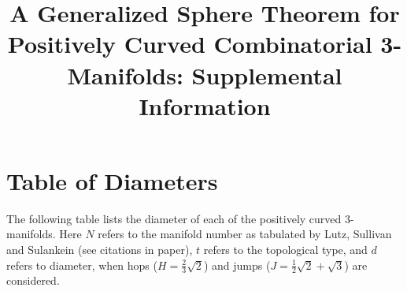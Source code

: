\documentclass[12pt]{article}
\begin{document}
\title{A Generalized Sphere Theorem for Positively Curved Combinatorial 3-Manifolds: Supplemental Information}

\maketitle

\section{Table of Diameters}

The following table lists the diameter of each of the positively curved 3-manifolds.  Here $N$ refers to the manifold number as tabulated by Lutz, Sullivan and Sulankein (see citations in paper), $t$ refers to the topological type, and $d$ refers to diameter, when hops ($H = \frac{2}{3}\sqrt{2}$) and jumps ($J = \frac{1}{2}\sqrt{2} + \sqrt{3}$) are considered.

\end{document}
